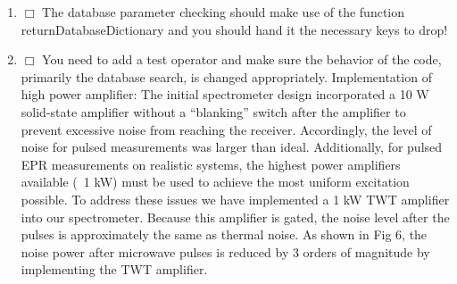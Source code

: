 \documentclass[10pt]{book}
\begin{document}
\begin{enumerate}
    \item $\Box$ The database parameter checking should make use of the function returnDatabaseDictionary and you should hand it the necessary keys to drop!
    \item $\Box$ You need to add a test operator and make sure the behavior of the code, primarily the database search, is changed appropriately.
Implementation of high power amplifier:
	The initial spectrometer design incorporated a 10 W solid-state amplifier without a “blanking” switch after the amplifier to prevent excessive noise from reaching the receiver. Accordingly, the level of noise for pulsed measurements was larger than ideal.  Additionally, for pulsed EPR measurements on realistic systems, the highest power amplifiers available (~1 kW) must be used to achieve the most uniform excitation possible. To address these issues we have implemented a 1 kW TWT amplifier into our spectrometer. Because this amplifier is gated, the noise level after the pulses is approximately the same as thermal noise. As shown in Fig 6, the noise power after microwave pulses is reduced by 3 orders of magnitude by implementing the TWT amplifier. 
 

\end{enumerate}
\end{document}
